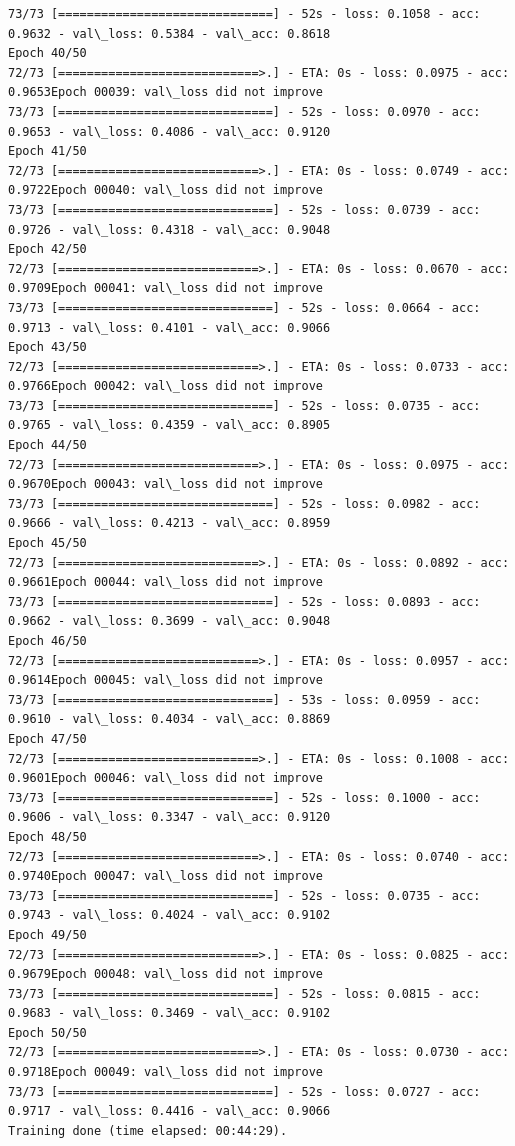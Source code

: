 \documentclass[11pt]{article}
\begin{document}
\begin{Verbatim}[commandchars=\\\{\}]
73/73 [==============================] - 52s - loss: 0.1058 - acc: 0.9632 - val\_loss: 0.5384 - val\_acc: 0.8618
Epoch 40/50
72/73 [============================>.] - ETA: 0s - loss: 0.0975 - acc: 0.9653Epoch 00039: val\_loss did not improve
73/73 [==============================] - 52s - loss: 0.0970 - acc: 0.9653 - val\_loss: 0.4086 - val\_acc: 0.9120
Epoch 41/50
72/73 [============================>.] - ETA: 0s - loss: 0.0749 - acc: 0.9722Epoch 00040: val\_loss did not improve
73/73 [==============================] - 52s - loss: 0.0739 - acc: 0.9726 - val\_loss: 0.4318 - val\_acc: 0.9048
Epoch 42/50
72/73 [============================>.] - ETA: 0s - loss: 0.0670 - acc: 0.9709Epoch 00041: val\_loss did not improve
73/73 [==============================] - 52s - loss: 0.0664 - acc: 0.9713 - val\_loss: 0.4101 - val\_acc: 0.9066
Epoch 43/50
72/73 [============================>.] - ETA: 0s - loss: 0.0733 - acc: 0.9766Epoch 00042: val\_loss did not improve
73/73 [==============================] - 52s - loss: 0.0735 - acc: 0.9765 - val\_loss: 0.4359 - val\_acc: 0.8905
Epoch 44/50
72/73 [============================>.] - ETA: 0s - loss: 0.0975 - acc: 0.9670Epoch 00043: val\_loss did not improve
73/73 [==============================] - 52s - loss: 0.0982 - acc: 0.9666 - val\_loss: 0.4213 - val\_acc: 0.8959
Epoch 45/50
72/73 [============================>.] - ETA: 0s - loss: 0.0892 - acc: 0.9661Epoch 00044: val\_loss did not improve
73/73 [==============================] - 52s - loss: 0.0893 - acc: 0.9662 - val\_loss: 0.3699 - val\_acc: 0.9048
Epoch 46/50
72/73 [============================>.] - ETA: 0s - loss: 0.0957 - acc: 0.9614Epoch 00045: val\_loss did not improve
73/73 [==============================] - 53s - loss: 0.0959 - acc: 0.9610 - val\_loss: 0.4034 - val\_acc: 0.8869
Epoch 47/50
72/73 [============================>.] - ETA: 0s - loss: 0.1008 - acc: 0.9601Epoch 00046: val\_loss did not improve
73/73 [==============================] - 52s - loss: 0.1000 - acc: 0.9606 - val\_loss: 0.3347 - val\_acc: 0.9120
Epoch 48/50
72/73 [============================>.] - ETA: 0s - loss: 0.0740 - acc: 0.9740Epoch 00047: val\_loss did not improve
73/73 [==============================] - 52s - loss: 0.0735 - acc: 0.9743 - val\_loss: 0.4024 - val\_acc: 0.9102
Epoch 49/50
72/73 [============================>.] - ETA: 0s - loss: 0.0825 - acc: 0.9679Epoch 00048: val\_loss did not improve
73/73 [==============================] - 52s - loss: 0.0815 - acc: 0.9683 - val\_loss: 0.3469 - val\_acc: 0.9102
Epoch 50/50
72/73 [============================>.] - ETA: 0s - loss: 0.0730 - acc: 0.9718Epoch 00049: val\_loss did not improve
73/73 [==============================] - 52s - loss: 0.0727 - acc: 0.9717 - val\_loss: 0.4416 - val\_acc: 0.9066
Training done (time elapsed: 00:44:29).

    \end{Verbatim}
\end{document}
